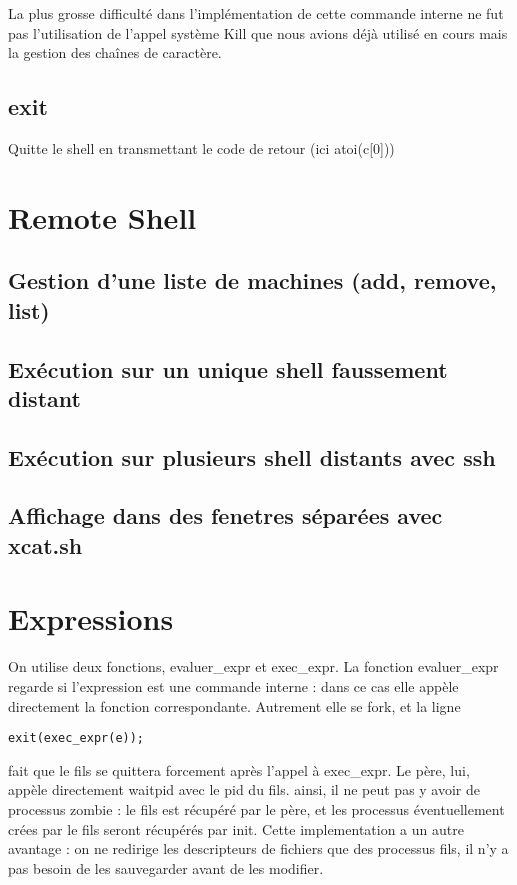 \documentclass[12pt]{report}
\begin{document}
La plus grosse difficulté dans l'implémentation de cette commande interne ne fut pas l'utilisation de l'appel système Kill que nous avions déjà utilisé en cours mais la gestion des chaînes de caractère.

\subsection{exit}
Quitte le shell en transmettant le code de retour (ici atoi(c[0]))

\newpage
\section{Remote Shell}
\subsection{Gestion d'une liste de machines (add, remove, list)}

\subsection{Exécution sur un unique shell faussement distant}

\subsection{Exécution sur plusieurs shell distants avec ssh}

\subsection{Affichage dans des fenetres séparées avec xcat.sh}

\newpage
\section{Expressions}
On utilise deux fonctions, evaluer\_expr et exec\_expr.
La fonction evaluer\_expr regarde si l'expression est une commande interne : dans ce cas elle appèle directement
la fonction correspondante. Autrement elle se fork, et la ligne 
\begin{verbatim}
exit(exec_expr(e));
\end{verbatim}
fait que le fils se quittera forcement après l'appel à exec\_expr.
\newline Le père, lui, appèle directement waitpid avec le pid du fils.
ainsi, il ne peut pas y avoir de processus zombie : le fils est récupéré par le père,
et les processus éventuellement crées par le fils seront récupérés par init.\newline
Cette implementation a un autre avantage : on ne redirige les descripteurs de fichiers que des processus fils,
il n'y a pas besoin de les sauvegarder avant de les modifier.
\end{document}
